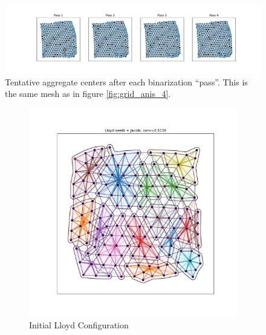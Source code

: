 \documentclass{article}
\begin{document}
\begin{figure}[h]
  \centering
  \includegraphics[width=\textwidth, trim=120 0 100 0, clip]{grid_anis_4_agg_pass.pdf}
  \caption{Tentative aggregate centers after each binarization ``pass''.  This is the same mesh as in figure \ref{fig:grid_anis_4}.}
\end{figure}

\begin{figure}[h]
  \centering
  \begin{subfigure}[t]{0.32\textwidth}
    \centering
    \includegraphics[width=\textwidth, trim=80 70 70 50, clip]{grid_anis_8_dumb.pdf}
    \caption{Initial Lloyd Configuration}
  \end{subfigure}
  \begin{subfigure}[t]{0.32\textwidth}
    \centering

\end{subfigure}
\end{figure}
\end{document}
